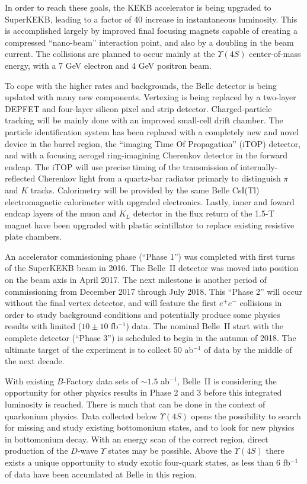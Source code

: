 \documentclass[12pt]{article}
\begin{document}
In order to reach these goals, the KEKB accelerator is being upgraded to SuperKEKB, leading to a factor of 40 increase in instantaneous luminosity. This is accomplished largely by improved final focusing magnets capable of creating a compressed ``nano-beam'' interaction point, and also by a doubling in the beam current. The collisions are planned to occur mainly at the $\Upsilon(4S)$ center-of-mass energy, with a 7 GeV electron and 4 GeV positron beam.

To cope with the higher rates and backgrounds, the Belle detector is being updated with many new components. Vertexing is being replaced by a two-layer DEPFET and four-layer silicon pixel and strip detector. Charged-particle tracking will be mainly done with an improved small-cell drift chamber. The particle identification system has been replaced with a completely new and novel device in the barrel region, the ``imaging Time Of Propagation'' (iTOP) detector, and with a focusing aerogel ring-imagining Cherenkov detector in the forward endcap. The iTOP will use precise timing of the transmission of internally-reflected Cherenkov light from a quartz-bar radiator primarly to distinguish $\pi$ and $K$ tracks. Calorimetry will be provided by the same Belle CsI(Tl) electromagnetic calorimeter with upgraded electronics. Lastly, inner and foward endcap layers of the muon and $K_{L}$ detector in the flux return of the 1.5-T magnet have been upgraded with plastic scintillator to replace existing resistive plate chambers.

An accelerator commissioning phase (``Phase 1'') was completed with first turns of the SuperKEKB beam in 2016. The Belle~II detector was moved into position on the beam axis in April 2017. The next milestone is another period of commissioning from December 2017 through July 2018. This ``Phase 2'' will occur without the final vertex detector, and will feature the first $e^{+}e^{-}$ collisions in order to study background conditions and potentially produce some physics results with limited ($10\pm10$ fb$^{-1}$) data. The nominal Belle~II start with the complete detector (``Phase 3'') is scheduled to begin in the autumn of 2018. The ultimate target of the experiment is to collect 50 ab$^{-1}$ of data by the middle of the next decade.

With existing $B$-Factory data sets of ${\sim}1.5$ ab$^{-1}$, Belle~II is considering the opportunity for other physics results in Phase 2 and 3 before this integrated luminosity is reached. There is much that can be done in the context of quarkonium physics. Data collected below $\Upsilon(4S)$ opens the possibility to search for missing and study existing bottomonium states, and to look for new physics in bottomonium decay. With an energy scan of the correct region, direct production of the $D$-wave $\Upsilon$ states may be possible. Above the $\Upsilon(4S)$ there exists a unique opportunity to study exotic four-quark states, as less than 6 fb$^{-1}$ of data have been accumlated at Belle in this region.
\end{document}
